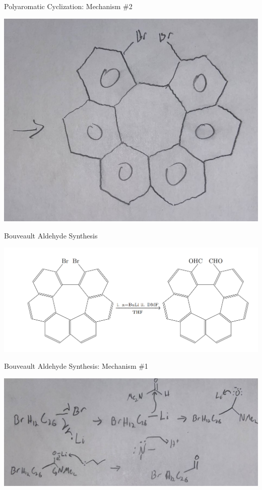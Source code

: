 \documentclass[notes]{beamer}
\begin{document}
\begin{frame}{Polyaromatic Cyclization: Mechanism \#2}
\begin{center}
    \includegraphics[scale=.43]{polyaromatic_cyclization_two.JPG}
\end{center}
\end{frame}


\begin{frame}{Bouveault Aldehyde Synthesis}
\begin{center}
    \includegraphics[scale=.45]{bouveault_aldehyde_synthesis_overall.PNG}
\end{center}
\end{frame}

\begin{frame}{Bouveault Aldehyde Synthesis: Mechanism \#1}
\begin{center}
    \includegraphics[scale=.37]{bouveault_aldehyde_sythesis_one.JPG}
\end{center}
\end{frame}
\end{document}
